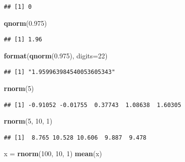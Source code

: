 \documentclass[11pt,]{krantz}
\makeatletter
\newenvironment{Shaded}{\begin{snugshade}}{\end{snugshade}}
\newcommand{\KeywordTok}[1]{\textcolor[rgb]{0.13,0.29,0.53}{\textbf{#1}}}
\newcommand{\DataTypeTok}[1]{\textcolor[rgb]{0.13,0.29,0.53}{#1}}
\newcommand{\DecValTok}[1]{\textcolor[rgb]{0.00,0.00,0.81}{#1}}
\newcommand{\FloatTok}[1]{\textcolor[rgb]{0.00,0.00,0.81}{#1}}
\newcommand{\StringTok}[1]{\textcolor[rgb]{0.31,0.60,0.02}{#1}}
\newcommand{\NormalTok}[1]{#1}
\newenvironment{kframe}{%
\medskip{}
\setlength{\fboxsep}{.8em}
 \def\at@end@of@kframe{}%
 \ifinner\ifhmode%
  \def\at@end@of@kframe{\end{minipage}}%
  \begin{minipage}{\columnwidth}%
 \fi\fi%
 \def\FrameCommand##1{\hskip\@totalleftmargin \hskip-\fboxsep
 \colorbox{shadecolor}{##1}\hskip-\fboxsep
     \hskip-\linewidth \hskip-\@totalleftmargin \hskip\columnwidth}%
 \MakeFramed {\advance\hsize-\width
   \@totalleftmargin\z@ \linewidth\hsize
   \@setminipage}}%
 {\par\unskip\endMakeFramed%
 \at@end@of@kframe}
\renewenvironment{Shaded}{\begin{kframe}}{\end{kframe}}
\theoremstyle{definition}
\theoremstyle{definition}
\theoremstyle{remark}
\makeatother
\begin{document}
\begin{verbatim}
## [1] 0
\end{verbatim}

\begin{Shaded}
\begin{Highlighting}[]
\KeywordTok{qnorm}\NormalTok{(}\FloatTok{0.975}\NormalTok{)}
\end{Highlighting}
\end{Shaded}

\begin{verbatim}
## [1] 1.96
\end{verbatim}

\begin{Shaded}
\begin{Highlighting}[]
\KeywordTok{format}\NormalTok{(}\KeywordTok{qnorm}\NormalTok{(}\FloatTok{0.975}\NormalTok{), }\DataTypeTok{digits=}\DecValTok{22}\NormalTok{)}
\end{Highlighting}
\end{Shaded}

\begin{verbatim}
## [1] "1.959963984540053605343"
\end{verbatim}

\begin{Shaded}
\begin{Highlighting}[]
\KeywordTok{rnorm}\NormalTok{(}\DecValTok{5}\NormalTok{)}
\end{Highlighting}
\end{Shaded}

\begin{verbatim}
## [1] -0.91052 -0.01755  0.37743  1.08638  1.60305
\end{verbatim}

\begin{Shaded}
\begin{Highlighting}[]
\KeywordTok{rnorm}\NormalTok{(}\DecValTok{5}\NormalTok{, }\DecValTok{10}\NormalTok{, }\DecValTok{1}\NormalTok{)}
\end{Highlighting}
\end{Shaded}

\begin{verbatim}
## [1]  8.765 10.528 10.606  9.887  9.478
\end{verbatim}

\begin{Shaded}
\begin{Highlighting}[]
\NormalTok{x =}\StringTok{ }\KeywordTok{rnorm}\NormalTok{(}\DecValTok{100}\NormalTok{, }\DecValTok{10}\NormalTok{, }\DecValTok{1}\NormalTok{)}
\KeywordTok{mean}\NormalTok{(x)}
\end{Highlighting}
\end{Shaded}
\end{document}
